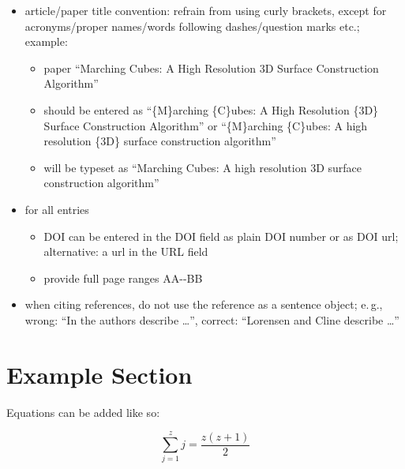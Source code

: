\documentclass[journal]{vgtc}                %
\begin{document}
\begin{itemize}
	\item article/paper title convention: refrain from using curly brackets, except for acronyms/proper names/words following dashes/question marks etc.; example:
		\begin{itemize}
			\item paper ``Marching Cubes: A High Resolution 3D Surface Construction Algorithm''
			\item should be entered as ``\{M\}arching \{C\}ubes: A High Resolution \{3D\} Surface Construction Algorithm'' or  ``\{M\}arching \{C\}ubes: A high resolution \{3D\} surface construction algorithm''
			\item will be typeset as ``Marching Cubes: A high resolution 3D surface construction algorithm''
		\end{itemize}
		\item for all entries
		\begin{itemize}
			\item DOI can be entered in the DOI field as plain DOI number or as DOI url; alternative: a url in the URL field
			\item provide full page ranges AA-{}-BB
		\end{itemize}
		
	\item when citing references, do not use the reference as a sentence object; e.\,g., wrong: ``In \cite{Lorensen:1987:MCA} the authors describe \dots'', correct: ``Lorensen and Cline \cite{Lorensen:1987:MCA} describe \dots''
\end{itemize}


\section{Example Section}

Equations can be added like so:

\begin{equation}
\label{eq:sum}
\sum_{j=1}^{z} j = \frac{z(z+1)}{2}
\end{equation}

\end{document}
